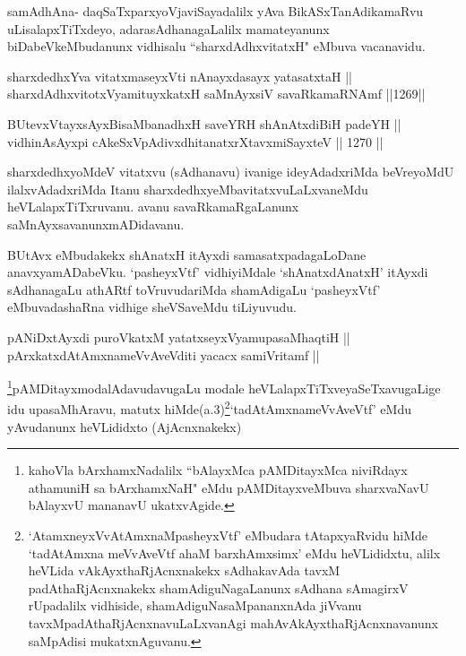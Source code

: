 \begin{artha}
samAdhAna- daqSaTxparxyoVjaviSayadalilx yAva BikASxTanAdi\-\break kamaRvu uLisalapxTiTxdeyo, adarasAdhanagaLalilx mamateyanunx biDabeVkeMbudanunx vidhisalu ``sharxdAdhxvitatxH" eMbuva vacanavidu.
\end{artha}

\begin{shl}
sharxdedhxYva vitatxmaseyxVti nAnayxdasayx yatasatxtaH || \\
sharxdAdhxvitotxV\s yamituyxkatxH saMnAyxsiV savaRkamaRNAmf \hfill ||1269||  
\end{shl}
				
\begin{shl}
BUtevxVtayxsAyxBisaMbanadhxH saveYRH shAnAtxdiBiH padeYH || \\
vidhinA\s sAyxpi cA\s \s keSxVpAdivxdhitanatxrXtavxmiSayxteV \hfill || 1270 ||  
\end{shl}

\begin{artha}
sharxdedhxyoMdeV vitatxvu (sAdhanavu) ivanige ideyAdadxriMda beVreyoMdU ilalxvAdadxriMda Itanu sharxdedhxyeMbavitatxvuLaLxvaneMdu heVLalapxTiTxruvanu. avanu savaRkamaRgaLanunx saMnAyxsavanunx\break mADidavanu.
\end{artha}

\begin{artha}
BUtAvx eMbudakekx shAnatxH itAyxdi samasatxpadagaLoDane anavxyamADabeVku. `pasheyxVtf' vidhiyiMdale `shAnatxdAnatxH' itAyxdi sAdhanagaLu athARtf toVruvudariMda shamAdigaLu `pasheyxVtf' eMbuvadashaRna vidhige sheVSaveMdu tiLiyuvudu.
\end{artha}


\begin{shl}
pANiDxtAyxdi puroVkatxM yatatxseyxVyamupasaMhaqtiH || \\
pArxkatxdAtAmxnameVvAveVditi yacacx samiVritamf ||
\end{shl}

\begin{artha}
\footnote{kahoVla bArxhamxNadalilx ``bAlayxMca pAMDitayxMca niviRdayx athamuniH sa bArxhamxNaH" eMdu pAMDitayxveMbuva sharxvaNavU bAlayxvU mananavU ukatxvAgide.}pAMDitayxmodalAdavudavugaLu modale heVLalapxTiTxveyaSeTx\break avugaLige idu upasaMhAravu, matutx hiMde(a.3)\break \footnote{`AtamxneyxVvA\s \s tAmxnaMpasheyxVtf' eMbudara tAtapxyaRvidu hiMde `tadAtAmxna meVvAveVtf ahaM barxhAmxsimx' eMdu heVLididxtu, alilx heVLida vAkAyxthaRjAcnxnakekx sAdhakavAda tavxM padAthaRjAcnxnakekx shamAdiguNagaLanunx sAdhana sAmagirxV rUpadalilx vidhiside, shamAdiguNasaMpananxnAda jiVvanu tavxMpadAthaRjAcnxnavuLaLxvanAgi mahAvAkAyxthaRjAcnxnavanunx saMpAdisi mukatxnAguvanu.}`tadAtAmxnameVvAveVtf' eMdu yAvudanunx heVLididxto (AjAcnxnakekx)
\end{artha}

